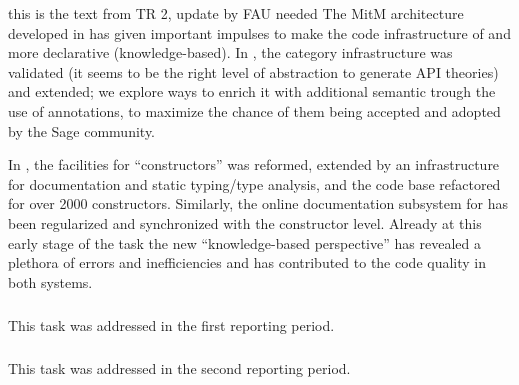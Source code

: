 \begin{oldpart}{this is the text from TR 2, update by FAU needed}
The MitM architecture developed in  has given important impulses to make the code infrastructure of \Sage and \GAP more declarative (knowledge-based).
In \Sage, the category infrastructure was validated (it seems to be the right level of abstraction to generate API theories) and extended; we explore ways to enrich it with additional semantic
trough the use of annotations, to maximize the chance of
them being accepted and adopted by the Sage community.

In \GAP, the facilities for ``constructors'' was reformed, extended by an infrastructure for documentation and static typing/type analysis, and the code base refactored for over 2000 constructors.
Similarly, the online documentation subsystem for \GAP has been regularized and synchronized with the constructor level.
Already at this early stage of the task the new ``knowledge-based perspective'' has revealed a plethora of errors and inefficiencies and has contributed to the code quality in both systems.
\end{oldpart}
\medskip

\subparagraph{}
\label{dksbases@data-OEIS}
This task was addressed in the first reporting period.
\medskip

\subparagraph{}
\label{dksbases@data-findstat}
This task was addressed in the second reporting period.
\medskip

